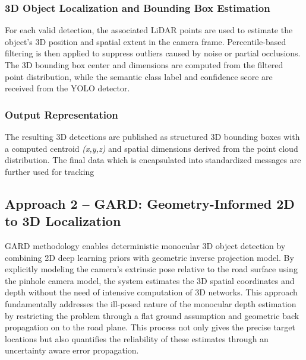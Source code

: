 \documentclass[12pt,a4paper]{report}
\begin{document}
\subsubsection{3D Object Localization and Bounding Box Estimation}
For each valid detection, the associated LiDAR points are used to estimate the object's 3D position and spatial extent in the camera frame. Percentile-based filtering is then applied to suppress outliers caused by noise or partial occlusions. The 3D bounding box center and dimensions are computed from the filtered point distribution, while the semantic class label and confidence score are received from the YOLO detector.
\subsubsection{Output Representation}
The resulting 3D detections are published as structured 3D bounding boxes with a computed centroid \textit{(x,y,z)} and spatial dimensions derived from the point cloud distribution. The final data which is  encapsulated into standardized messages are further used for tracking

\subsection{Approach 2 -- GARD: Geometry-Informed 2D to 3D Localization}
GARD methodology enables deterministic monocular 3D object detection by combining 2D deep learning priors with geometric inverse projection model. By explicitly modeling the camera’s extrinsic pose relative to the road surface using the pinhole camera model, the system estimates the 3D spatial coordinates and depth without the need of intensive computation of 3D networks. This approach fundamentally addresses the ill-posed nature of the monocular depth estimation by restricting the problem through a flat ground assumption and geometric back propagation on to the road plane. This process not only gives the precise target locations but also quantifies the reliability of these estimates through an uncertainty aware error propagation. 
\end{document}
